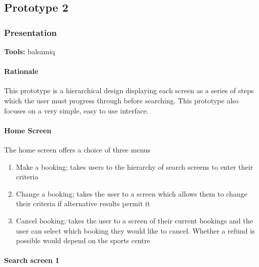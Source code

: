\subsection{Prototype 2}

\subsubsection{Presentation}
\textbf{Tools:} balsamiq

\paragraph{Rationale}
This prototype is a hierarchical design displaying each screen as a series of
steps which the user must progress through before searching. This prototype
also focuses on a very simple, easy to use interface.

\paragraph{Home Screen}

The home screen offers a choice of three menus

\begin{enumerate}
	\item Make a booking; takes users to the hierarchy of search screens to
		enter their criteria
	\item Change a booking; takes the user to a screen which allows them to
		change their criteria if alternative results permit it
	\item Cancel booking; takes the user to a screen of their current bookings
		and the user can select which booking they would like to cancel.
		Whether a refund is possible would depend on the sports centre
\end{enumerate}

\paragraph{Search screen 1}


